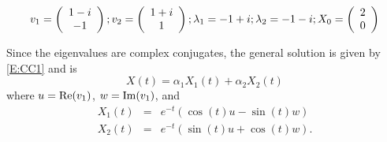 \documentclass{ximera}
\begin{document}
\begin{exercise} \label{A6.4.3}
\[
v_1 = \left(\begin{array}{cccccccccccc}  1 -i \\ -1 \end{array}\right); v_2 = \left(\begin{array}{cccccccccccc}  1 + i \\ 1  \end{array}\right); \lambda_1 = -1+i;  \lambda_2 = -1-i; X_0 = \left(\begin{array}{rrrrrrrrrrrrrrrrrr} 2 \\ 0 \end{array}\right)
\]

\begin{solution}
\soln Since the eigenvalues are complex conjugates, the general solution is given by \eqref{E:CC1} and is
\[
X(t) = \alpha_1 X_1(t) + \alpha_2 X_2(t)
\]
where $u={\rm Re}(v_1)$, $w={\rm Im}(v_1)$, and 
\[
\begin{array}{rcl}
X_1(t) & = & e^{-t}(\cos(t)u -\sin(t)w)\\
X_2(t) & = & e^{-t}(\sin(t)u +\cos(t)w).
\end{array}
\]
\begin{figure}[htb]
           \centerline{%
           }
\end{figure}
\end{solution}
\end{exercise}
\end{document}
